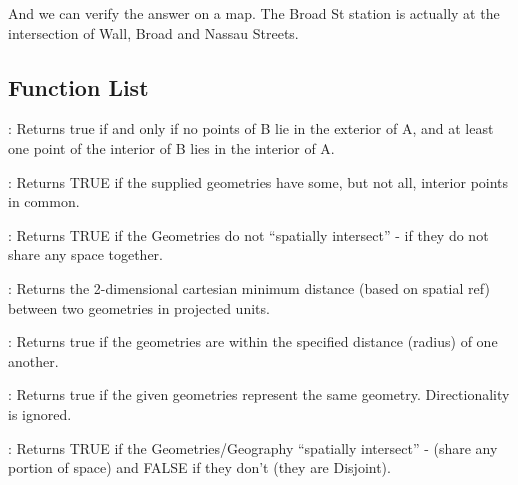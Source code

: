 \documentclass[a4paper,11pt,english]{sphinxmanual}
\begin{document}
\begin{sphinxVerbatim}[commandchars=\\\{\}]
    
    
    
\end{sphinxVerbatim}

And we can verify the answer on a map. The Broad St station is actually at the intersection of Wall, Broad and Nassau Streets.

\noindent{}


\subsection{Function List}
\label{\detokenize{basic:id10}}
: Returns true if and only if no points of B lie in the exterior of A, and at least one point of the interior of B lies in the interior of A.

: Returns TRUE if the supplied geometries have some, but not all, interior points in common.

: Returns TRUE if the Geometries do not “spatially intersect” - if they do not share any space together.

: Returns the 2-dimensional cartesian minimum distance (based on spatial ref) between two geometries in projected units.

: Returns true if the geometries are within the specified distance (radius) of one another.

: Returns true if the given geometries represent the same geometry. Directionality is ignored.

: Returns TRUE if the Geometries/Geography “spatially intersect” - (share any portion of space) and FALSE if they don’t (they are Disjoint).
\end{document}
